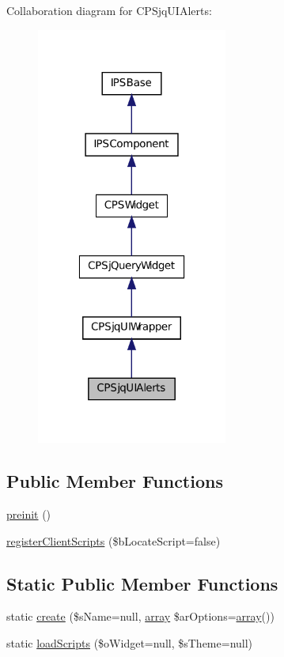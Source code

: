 Collaboration diagram for CPSjqUIAlerts:\nopagebreak
\begin{figure}[H]
\begin{center}
\leavevmode
\includegraphics[width=178pt]{classCPSjqUIAlerts__coll__graph}
\end{center}
\end{figure}
\subsection*{Public Member Functions}
\begin{DoxyCompactItemize}
\item 
\hyperlink{classCPSjqUIAlerts_a2dc262e99b1c246b56f27626bfe699ff}{preinit} ()
\item 
\hyperlink{classCPSjqUIAlerts_ac02a66bde8e72e4909137bf748edf665}{registerClientScripts} (\$bLocateScript=false)
\end{DoxyCompactItemize}
\subsection*{Static Public Member Functions}
\begin{DoxyCompactItemize}
\item 
static \hyperlink{classCPSjqUIAlerts_a0ffc269a208148ade57c7eb608a4562a}{create} (\$sName=null, \hyperlink{list_8php_aa3205d038c7f8feb5c9f01ac4dfadc88}{array} \$arOptions=\hyperlink{list_8php_aa3205d038c7f8feb5c9f01ac4dfadc88}{array}())
\item 
static \hyperlink{classCPSjqUIAlerts_a561cda05113b81fc962133829351f41e}{loadScripts} (\$oWidget=null, \$sTheme=null)
\end{DoxyCompactItemize}
